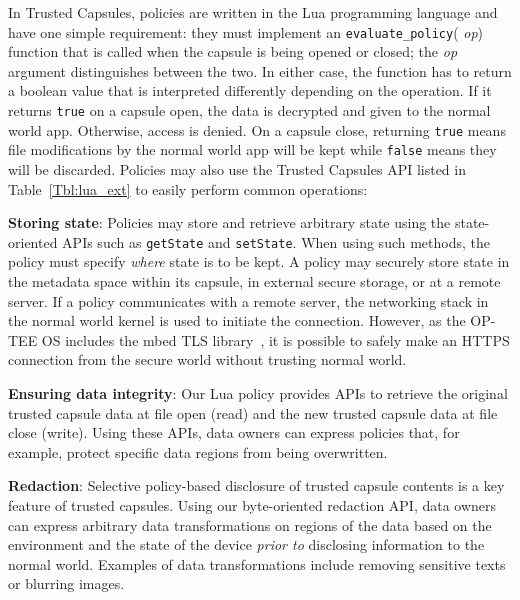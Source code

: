 In Trusted Capsules, policies are written in the Lua programming language and
have one simple requirement: they must implement an {\tt evaluate\_policy}({\em
        op}) function that is called when the capsule is being opened or closed; the
    {\em op} argument distinguishes between the two. In either case, the function
has to return a boolean value that is interpreted differently depending on the
operation. If it returns {\tt true} on a capsule open, the data is decrypted and
given to the normal world app. Otherwise, access is denied. On a capsule close,
returning {\tt true} means file modifications by the normal world app will be
kept while {\tt false} means they will be discarded. Policies may also use the
Trusted Capsules API listed in Table~\ref{Tbl:lua_ext} to easily perform common
operations:

\textbf{Storing state}: Policies may store and retrieve arbitrary state using
the state-oriented APIs such as {\tt getState} and {\tt setState}. When using
such methods, the policy must specify {\em where}
state is to be kept. A policy may securely store state in the metadata space within
its capsule, in external secure storage, or at a remote server. If a policy
communicates with a remote server, the networking stack in the normal world
kernel is used to initiate the connection. However, as the OP-TEE OS includes
the mbed TLS library~\cite{mbed}, it is possible to safely make an HTTPS
connection from the secure world without trusting normal world.

\textbf{Ensuring data integrity}: Our Lua policy provides APIs to retrieve the
original trusted capsule data at file open (read) and the new trusted capsule
data at file close (write). Using these APIs, data owners can express
policies that, for example, protect specific data regions from being
overwritten. %

\textbf{Redaction}: Selective policy-based disclosure of trusted capsule
contents is a key feature of trusted capsules. Using our byte-oriented
redaction API, data owners can express arbitrary data
transformations on regions of the data based on the environment and
the state of the device \emph{prior to} disclosing information to the normal world.  Examples
of data transformations include removing sensitive texts or blurring
images. %

